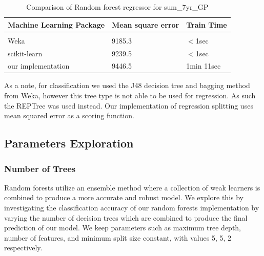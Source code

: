 \documentclass{article} %
\begin{document}
\begin{table}[h]
\caption{Comparison of Random forest regressor for sum\_7yr\_GP}
\label{reg-table}
\begin{center}
\begin{tabular}{lll}
\multicolumn{1}{c}{\bf Machine Learning Package} &\multicolumn{1}{c}{\bf Mean square error} &\multicolumn{1}{c}{\bf Train Time}
\\ \hline \\
Weka         &9185.3	&$<$1sec \\
scikit-learn             &9239.5	&$<$1sec \\
our implementation             &9446.5	&1min 11sec \\
\end{tabular}
\end{center}
\end{table}

As a note, for classification we used the J48 decision tree and bagging method from Weka, however this tree type is not able to be used for regression. As such the REPTree was used instead. Our implementation of regression splitting uses mean squared error as a scoring function.\cite{Brieman84}

\subsection{Parameters Exploration}

\subsubsection{Number of Trees}

Random forests utilize an ensemble method where a collection of weak learners is combined to produce a more accurate and robust model. We explore this by investigating the classification accuracy of our random forests implementation by varying the number of decision trees which are combined to produce the final prediction of our model. We keep parameters such as maximum tree depth, number of features, and minimum split size constant, with values 5, 5, 2 respectively.
\end{document}
